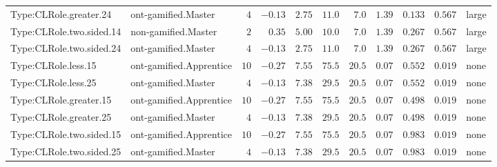 \documentclass[6pt,a4paper]{article}
\begin{document}
{\begin{longtable}{llrrrrrrrrl}
Type:CLRole.greater.24&ont-gamified.Master&$ 4$&$-0.13$&$ 2.75$&$ 11.0$&$ 7.0$&$1.39$&$0.133$&$0.567$&large\tabularnewline
Type:CLRole.two.sided.14&non-gamified.Master&$ 2$&$ 0.35$&$ 5.00$&$ 10.0$&$ 7.0$&$1.39$&$0.267$&$0.567$&large\tabularnewline
Type:CLRole.two.sided.24&ont-gamified.Master&$ 4$&$-0.13$&$ 2.75$&$ 11.0$&$ 7.0$&$1.39$&$0.267$&$0.567$&large\tabularnewline
Type:CLRole.less.15&ont-gamified.Apprentice&$10$&$-0.27$&$ 7.55$&$ 75.5$&$20.5$&$0.07$&$0.552$&$0.019$&none\tabularnewline
Type:CLRole.less.25&ont-gamified.Master&$ 4$&$-0.13$&$ 7.38$&$ 29.5$&$20.5$&$0.07$&$0.552$&$0.019$&none\tabularnewline
Type:CLRole.greater.15&ont-gamified.Apprentice&$10$&$-0.27$&$ 7.55$&$ 75.5$&$20.5$&$0.07$&$0.498$&$0.019$&none\tabularnewline
Type:CLRole.greater.25&ont-gamified.Master&$ 4$&$-0.13$&$ 7.38$&$ 29.5$&$20.5$&$0.07$&$0.498$&$0.019$&none\tabularnewline
\newpage
Type:CLRole.two.sided.15&ont-gamified.Apprentice&$10$&$-0.27$&$ 7.55$&$ 75.5$&$20.5$&$0.07$&$0.983$&$0.019$&none\tabularnewline
Type:CLRole.two.sided.25&ont-gamified.Master&$ 4$&$-0.13$&$ 7.38$&$ 29.5$&$20.5$&$0.07$&$0.983$&$0.019$&none\tabularnewline
\hline
\end{longtable}}
\end{document}
